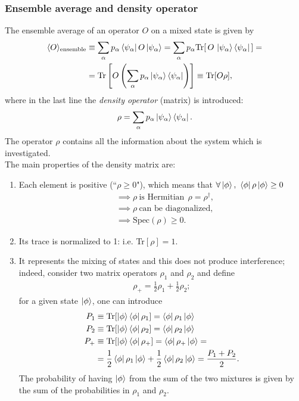 \subsubsection{Ensemble average and density operator}
The ensemble average of an operator $O$ on a mixed state is given by 
\begin{align*}
    \langle O \rangle_\text{ensemble} &\equiv \sum_\alpha p_\alpha \bra{\psi_\alpha} O \ket{\psi_\alpha} = \sum_\alpha p_\alpha \text{Tr}[ \, O \, \ket{\psi_\alpha} \bra{\psi_\alpha} \,] = \\
    &= \text{Tr} \left[ O \left( \sum_\alpha p_\alpha \ket{\psi_\alpha} \bra{\psi_\alpha} \right) \right] \equiv \text{Tr}[O \rho],
\end{align*}
where in the last line the \textit{density operator} (matrix) is introduced:
\begin{equation}
    \rho = \sum_\alpha p_\alpha \ket{\psi_\alpha} \bra{\psi_\alpha}. 
\end{equation}
The operator $\rho$ contains all the information about the system which is investigated. \\
The main properties of the density matrix are:
\begin{enumerate}
    \item Each element is positive (``$\rho \geq 0$"), which means that $\forall \ket{\phi}, ~\bra{\phi} \rho \ket{\phi} \geq 0$
    \begin{align*}
        & \implies \rho ~\text{is Hermitian} ~~ \rho = \rho^\dagger, \\
        & \implies \rho ~\text{can be diagonalized}, \\
        & \implies \text{Spec}(\rho) \geq 0. 
    \end{align*}
    \item Its trace is normalized to 1: i.e. Tr$[\rho] = 1$. 
    \item It represents the mixing of states and this does not produce interference; indeed, consider two matrix operators $\rho_1$ and $\rho_2$ and define 
    \begin{align*}
        \rho_+ = \frac{1}{2} \rho_1 + \frac{1}{2} \rho_2;
    \end{align*}
    for a given state $\ket{\phi}$, one can introduce 
    \begin{align*}
        P_1 &\equiv \text{Tr}[\ket{\phi}\bra{\phi} \rho_1] = \bra{\phi} \rho_1 \ket{\phi} \\
        P_2 &\equiv \text{Tr}[\ket{\phi}\bra{\phi} \rho_2] = \bra{\phi} \rho_2 \ket{\phi} \\
        P_+ &\equiv \text{Tr}[\ket{\phi}\bra{\phi} \rho_+] = \bra{\phi} \rho_+ \ket{\phi} = \\
        &= \frac{1}{2} \bra{\phi} \rho_1 \ket{\phi} + \frac{1}{2} \bra{\phi} \rho_2 \ket{\phi} = \frac{P_1 + P_2}{2}. 
    \end{align*}
    The probability of having $\ket{\phi}$ from the sum of the two mixtures is given by the sum of the probabilities in $\rho_1$ and $\rho_2$. 
\end{enumerate}


